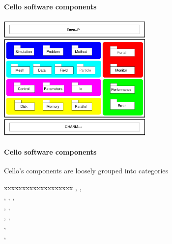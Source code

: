 \NEWSEC

\subsection{\ssComponents}


\begin{frame}[fragile,label=ss-components] 
\secframetitle{\ssOop}
\framesubtitle{Cello software components}
\vspace{-0.2in}
\begin{center}
\includegraphics[width=3.0in]{components-1509.pdf}
\end{center}
\end{frame}


\begin{frame}[fragile] 
\secframetitle{\ssComponents}
\framesubtitle{Cello software components}
Cello's components are loosely grouped into categories
\begin{center}
\begin{minipage}{3in}
\begin{tabbing}
xxxxxxxxxxxxxxxxxxx\=\kill
{}\> , ,  \\
\> , , ,  \\
\> , ,   \\
\> , ,  \\
\> ,   \\
\> , 
\end{tabbing}
\end{minipage}
\end{center}
\end{frame}

